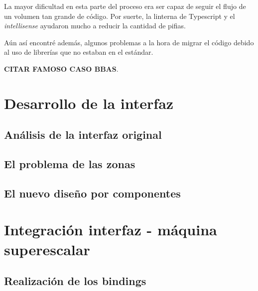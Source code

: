 \bigskip
La mayor dificultad en esta parte del proceso era ser capaz de seguir el flujo de un volumen tan grande
de código. Por suerte, la linterna de Typescript y el \textit{intellisense} ayudaron mucho a reducir la cantidad
de pifias.

\bigskip
Aún así encontré además, algunos problemas a la hora de migrar el código debido al uso de librerías 
que no estaban en el estándar.

\textbf{CITAR FAMOSO CASO BBAS}.

\section{Desarrollo de la interfaz}
\label{5:sec3} 

\subsection{Análisis de la interfaz original}

\subsection{El problema de las zonas}

\subsection{El nuevo diseño por componentes}

\section{Integración interfaz - máquina superescalar}
\label{5:sec3} 

\subsection{Realización de los bindings}


